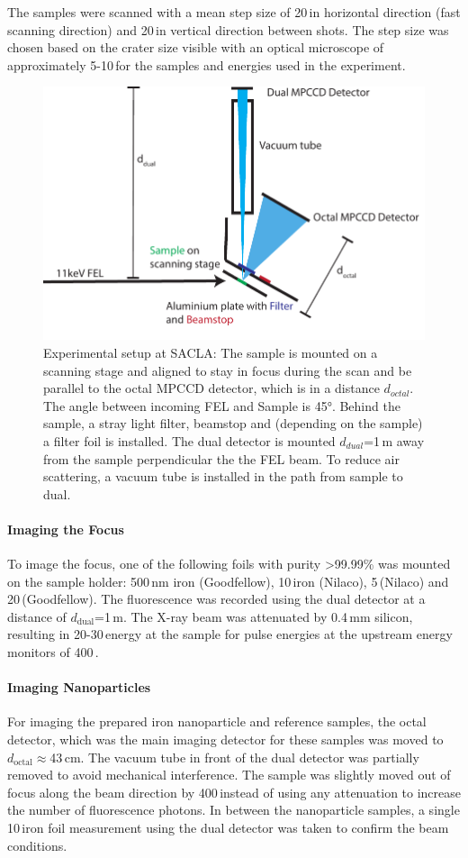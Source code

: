 The samples were scanned with a mean step size of 20\,\micrometer in horizontal direction (fast scanning direction) and 20\,\micrometer in vertical direction between shots. The step size was chosen based on the crater size visible with an optical microscope of approximately 5-10\,\micrometer for the samples and energies used in the experiment.

\begin{figure}
	\centering
	\includegraphics[width=0.75\linewidth]{images/setup.pdf}
	\caption[Experimental setup at SACLA]{Experimental setup at SACLA: The sample is mounted on a scanning stage and aligned to stay in focus during the scan and be parallel to the octal MPCCD detector, which is in a distance $d_{octal}$. The angle between incoming FEL and Sample is 45°. Behind the sample, a stray light filter, beamstop and (depending on the sample) a filter foil is installed. The dual detector is mounted $d_{dual}$=1\,m away from the sample perpendicular the the FEL beam. To reduce air scattering, a vacuum tube is installed in the path from sample to dual.}
	\label{fig:setup}
\end{figure}
\paragraph{Imaging the Focus}
To image the focus, one of the following foils with purity >99.99\% was mounted on the sample holder: 500\,nm iron (Goodfellow), 10\,\micrometer iron (Nilaco), 5\,\micrometer (Nilaco) and 20\,\micrometer (Goodfellow). The fluorescence was recorded using the dual detector at a distance of $d_\text{dual}$=1\,m.
The X-ray beam was attenuated by 0.4\,mm silicon, resulting in 20-30\,\microjoule  energy at the sample for pulse energies at the upstream energy monitors of 400\,\microjoule \cite{yabashi2015,tono2013}.
\paragraph{Imaging Nanoparticles}
For imaging the prepared iron nanoparticle and reference samples, the octal detector, which was the main imaging detector for these samples was moved to $d_\text{octal}\approx$43\,cm. The vacuum tube in front of the dual detector was partially removed to avoid mechanical interference. The sample was slightly moved out of focus along the beam direction by 400\,\micrometer instead of using any attenuation to increase the number of fluorescence photons. In between the nanoparticle samples, a single 10\,\micrometer iron foil measurement using the dual detector was taken to confirm the beam conditions.


